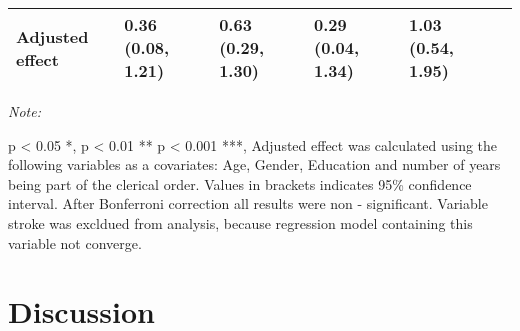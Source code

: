 \documentclass[ijerph,article,accept,moreauthors,pdftex]{mdpi}
\begin{document}
\begin{table}[!h]
{\begin{threeparttable}
\begin{tabular}[t]{llllll}
Adjusted effect & 0.36 (0.08, 1.21) & 0.63 (0.29, 1.30) & 0.29 (0.04, 1.34) & 1.03 (0.54, 1.95) & \\
\bottomrule
\end{tabular}
\begin{tablenotes}[para]
\item \textit{Note:} 
\item p < 0.05 *, p < 0.01 ** p < 0.001 ***, Adjusted effect was calculated using the following variables as a covariates: Age, Gender, Education and number of years being part of the clerical order. Values in brackets indicates 95\% confidence interval. After Bonferroni correction all results were non - significant. Variable stroke was excldued from analysis, because regression model containing this variable not converge.
\end{tablenotes}
\end{threeparttable}}
\end{table}

\hypertarget{discussion}{%
\section{Discussion}\label{discussion}}
\end{document}
